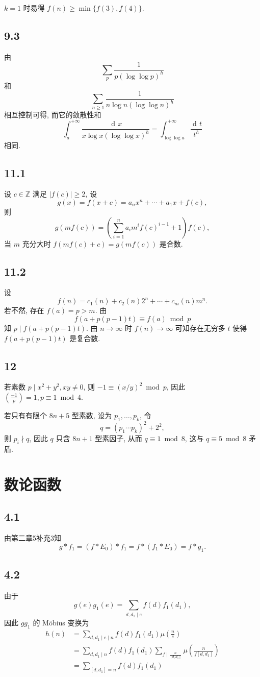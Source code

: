 \documentclass[12pt,a4paper,reqno]{amsart}
\theoremstyle{remark}
\newcommand{\Z}{\mathbb{Z}}
\newcommand{\leg}[2]{\left(\frac{#1}{#2}\right)}    %
\renewcommand{\ge}{\geqslant}
\DeclareMathOperator{\ud}{\mathrm{d\!}}
\begin{document}
$k=1$ 时易得 $f(n)\ge \min\{f(3),f(4)\}$.

\subsection*{9.3}
由
  \[\sum_p \frac{1}{p(\log\log p)^h}\]
和
  \[ \sum_{n\ge 1} \frac{1}{n\log n(\log \log n)^h}\]
相互控制可得, 而它的敛散性和
  \[\int_a^{+\infty} \frac{\ud x}{x\log x(\log \log x)^h}=\int_{\log\log a}^{+\infty} \frac{\ud t}{t^h}\]
相同.

\subsection*{11.1}
设 $c\in\Z$ 满足 $|f(c)|\ge 2$, 设
  \[g(x)=f(x+c)=a_nx^n+\cdots+a_1x+f(c),\]
则
  \[g(mf(c))=(\sum_{i=1}^n a_i m^i f(c)^{i-1} +1)f(c),\]
当 $m$ 充分大时 $f(mf(c)+c)=g(mf(c))$ 是合数.

\subsection*{11.2}
设
  \[f(n)=c_1(n)+c_2(n)2^n+\cdots+c_m(n)m^n.\]
若不然, 存在 $f(a)=p>m$. 由
   \[f(a+p(p-1)t)\equiv f(a)\bmod p\]
知 $p\mid f(a+p(p-1)t)$. 由 $n\rightarrow\infty$ 时 $f(n)\rightarrow\infty$ 可知存在无穷多 $t$ 使得 $f(a+p(p-1)t)$ 是复合数.

\subsection*{12}
若素数 $p\mid x^2+y^2,xy\neq0$, 则 $-1\equiv(x/y)^2\bmod p$, 因此 $\leg{-1}{p}=1, p\equiv 1\bmod 4$.

若只有有限个 $8n+5$ 型素数, 设为 $p_1,\ldots,p_k$, 令
  \[q=(p_1\cdots p_k)^2+2^2,\]
则 $p_i\nmid q$, 因此 $q$ 只含 $8n+1$ 型素因子, 从而 $q\equiv 1\bmod 8$, 这与  $q\equiv 5\bmod 8$ 矛盾.

\section{数论函数}
\subsection*{4.1}
由第二章5补充3知
  \[g*f_1=(f*E_0)*f_1=f*(f_1*E_0)=f*g_1.\]

\subsection*{4.2}
由于
  \[g(e)g_1(e)=\sum_{d,d_1\mid e}f(d)f_1(d_1),\]
因此 $gg_1$ 的 M\"obius 变换为
  \[\begin{split}
    h(n)&=\sum_{d,d_1\mid e\mid n} f(d)f_1(d_1)\mu(\frac{n}{e})\\
        &=\sum_{d,d_1\mid n} f(d)f_1(d_1)\sum_{f\mid \frac{n}{[d,d_1]}}\mu(\frac{n}{f[d,d_1]})\\
        &=\sum_{[d,d_1]=n} f(d)f_1(d_1)
  \end{split}\]
\end{document}
